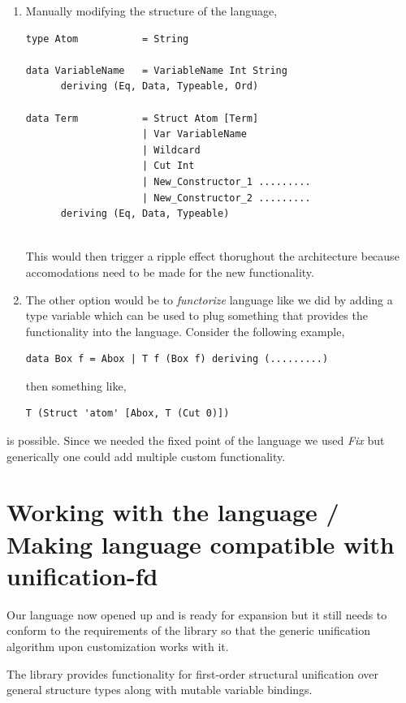 \documentclass[thesis-solanki.tex]{subfiles}
\begin{document}
\begin{enumerate}
\item Manually modifying the structure of the language,
\begin{verbatim}
type Atom         	= String

data VariableName 	= VariableName Int String
      deriving (Eq, Data, Typeable, Ord)

data Term 			= Struct Atom [Term]
          			| Var VariableName
          			| Wildcard  
          			| Cut Int
          			| New_Constructor_1 .........
          			| New_Constructor_2 .........
      deriving (Eq, Data, Typeable)
      
\end{verbatim}

This would then trigger a ripple effect thorughout the architecture because accomodations need to be made for the new functionality.

\item The other option would be to \textit{functorize} language like we did by adding a type variable which can be used to plug something that provides the functionality into the language.
Consider the following example,

\begin{verbatim}
data Box f = Abox | T f (Box f) deriving (.........)
\end{verbatim}

then something like,
\begin{verbatim}
T (Struct 'atom' [Abox, T (Cut 0)])
\end{verbatim}
\end{enumerate}
is possible. Since we needed the fixed point of the language we used \textit{Fix} but generically one could add multiple custom 
functionality.
 


\section{Working with the language / Making language compatible with unification-fd}

Our language now opened up and is ready for expansion but it still needs to conform to the requirements of the \cite{unification-fd-lib} 
library so that the generic unification algorithm upon customization works with it.

The library provides functionality for first-order structural unification over general structure types along with mutable variable 
bindings.
\end{document}
